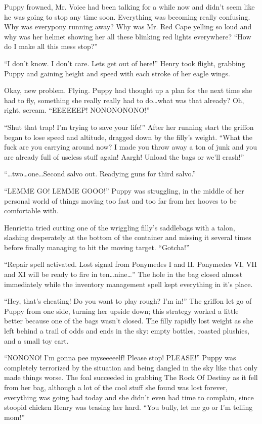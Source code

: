 Puppy frowned, Mr. Voice had been talking for a while now and didn't seem like he was going to stop any time soon. Everything was becoming really confusing. Why was everypony running away? Why was Mr. Red Cape yelling so loud and why was her helmet showing her all these blinking red lights everywhere? ``How do I make all this mess stop?''

``I don't know. I don't care. Lets get out of here!'' Henry took flight, grabbing Puppy and gaining height and speed with each stroke of her eagle wings.

Okay, new problem. Flying. Puppy had thought up a plan for the next time she had to fly, something she really really had to do\dots what was that already? Oh, right, scream. ``EEEEEEP! NONONONONO!''

``Shut that trap! I'm trying to save your life!'' After her running start the griffon began to lose speed and altitude, dragged down by the filly's weight. ``What the fuck are you carrying around now? I made you throw away a ton of junk and you are already full of useless stuff again! Aargh! Unload the bags or we'll crash!''

``{\mt \ldots two\dots one\dots Second salvo out. Readying guns for third salvo.}''

``LEMME GO! LEMME GOOO!'' Puppy was struggling, in the middle of her personal world of things moving too fast and too far from her hooves to be comfortable with.

Henrietta tried cutting one of the wriggling filly's saddlebags with a talon, slashing desperately at the bottom of the container and missing it several times before finally managing to hit the moving target. ``Gotcha!''

``{\mt Repair spell activated. Lost signal from Ponymedes I and II. Ponymedes VI, VII and XI will be ready to fire in ten\dots nine\dots}'' The hole in the bag closed almost immediately while the inventory management spell kept everything in it's place.

``Hey, that's cheating! Do you want to play rough? I'm in!'' The griffon let go of Puppy from one side, turning her upside down; this strategy worked a little better because one of the bags wasn't closed. The filly rapidly lost weight as she left behind a trail of odds and ends in the sky: empty bottles, roasted plushies, and a small toy cart.

``NONONO! I'm gonna pee myseeeeelf! Please stop! PLEASE!'' Puppy was completely terrorized by the situation and being dangled in the sky like that only made things worse. The foal succeeded in grabbing The Rock Of Destiny as it fell from her bag, although a lot of the cool stuff she found was lost forever, everything was going bad today and she didn't even had time to complain, since stoopid chicken Henry was teasing her hard. ``You bully, let me go or I'm telling mom!''

